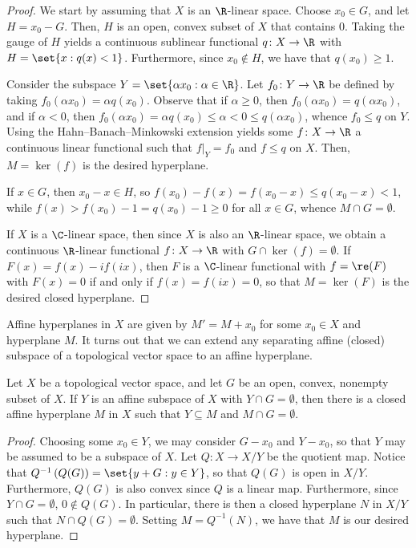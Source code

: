 \documentclass[10pt]{mypackage}
\begin{document}
\begin{proof}
  We start by assuming that $X$ is an $\R$-linear space. Choose $x_0\in G$, and let $H = x_0-G$. Then, $H$ is an open, convex subset of $X$ that contains $0$. Taking the gauge of $H$ yields a continuous sublinear functional $q\colon X\rightarrow \R$ with $H = \set{x : q(x) < 1}$. Furthermore, since $x_0\notin H$, we have that $q\left( x_0 \right)\geq 1$.

  Consider the subspace $Y = \set{\alpha x_0 : \alpha\in \R}$. Let $f_0\colon Y\rightarrow \R$ be defined by taking $f_0\left( \alpha x_0 \right) = \alpha q\left( x_0 \right)$. Observe that if $\alpha \geq 0$, then $f_0\left( \alpha x_0 \right) = q\left( \alpha x_0 \right)$, and if $\alpha < 0$, then $f_0\left( \alpha x_0 \right) = \alpha q\left( x_0 \right) \leq \alpha < 0 \leq q\left( \alpha x_0 \right)$, whence $f_0\leq q$ on $Y$. Using the Hahn--Banach--Minkowski extension yields some $f\colon X\rightarrow \R $ a continuous linear functional such that $f|_{Y} = f_0$ and $f\leq q$ on $X$. Then, $M = \ker\left( f \right)$ is the desired hyperplane.

  If $x\in G$, then $x_0-x\in H$, so $f\left( x_0 \right) - f\left( x \right) = f\left( x_0-x \right) \leq q\left( x_0-x \right) < 1$, while $f(x) > f\left( x_0 \right) - 1 = q\left( x_0 \right)-1\geq 0$ for all $x\in G$, whence $M \cap G = \emptyset$.

  If $X$ is a $\C$-linear space, then since $X$ is also an $\R$-linear space, we obtain a continuous $\R$-linear functional $f\colon X\rightarrow \R$ with $G\cap \ker\left( f \right) = \emptyset$. If $F(x) = f(x) - if(ix)$, then $F$ is a $\C$-linear functional with $f = \re(F)$ with $F(x) = 0$ if and only if $f(x) = f(ix) = 0$, so that $M = \ker\left( F \right)$ is the desired closed hyperplane.
\end{proof}
Affine hyperplanes in $X$ are given by $M' = M + x_0$ for some $x_0\in X$ and hyperplane $M$. It turns out that we can extend any separating affine (closed) subspace of a topological vector space to an affine hyperplane.
\begin{corollary}
  Let $X$ be a topological vector space, and let $G$ be an open, convex, nonempty subset of $X$. If $Y$ is an affine subspace of $X$ with $Y\cap G = \emptyset$, then there is a closed affine hyperplane $M$ in $X$ such that $Y\subseteq M$ and $M\cap G = \emptyset$.
\end{corollary}
\begin{proof}
  Choosing some $x_0\in Y$, we may consider $G-x_0$ and $Y - x_0$, so that $Y$ may be assumed to be a subspace of $X$. Let $Q\colon X\rightarrow X/Y$ be the quotient map. Notice that $Q^{-1}\left( Q(G) \right) = \set{y + G : y\in Y}$, so that $Q(G)$ is open in $X/Y$. Furthermore, $Q(G)$ is also convex since $Q$ is a linear map. Furthermore, since $Y\cap G = \emptyset$, $0\notin Q(G)$. In particular, there is then a closed hyperplane $N$ in $X/Y$ such that $N\cap Q(G) = \emptyset$. Setting $M = Q^{-1}\left( N \right)$, we have that $M$ is our desired hyperplane.
\end{proof}
\end{document}
